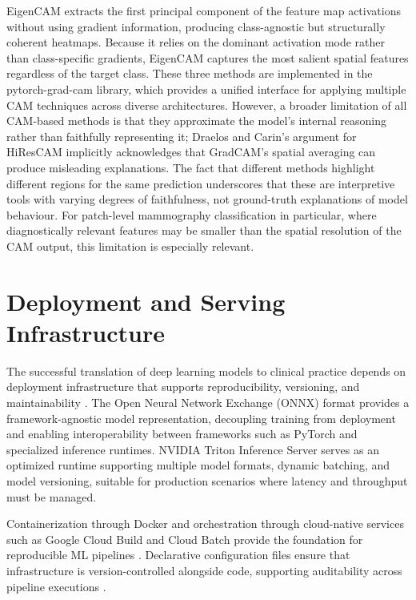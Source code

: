 \documentclass[justified,notoc,openany]{tufte-book}
\begin{document}
EigenCAM \cite{MuhammadYeasin2020} extracts the first principal component of the feature map activations without using gradient information, producing class-agnostic but structurally coherent heatmaps. Because it relies on the dominant activation mode rather than class-specific gradients, EigenCAM captures the most salient spatial features regardless of the target class. These three methods are implemented in the pytorch-grad-cam library, which provides a unified interface for applying multiple CAM techniques across diverse architectures. However, a broader limitation of all CAM-based methods is that they approximate the model's internal reasoning rather than faithfully representing it; Draelos and Carin's argument for HiResCAM implicitly acknowledges that GradCAM's spatial averaging can produce misleading explanations. The fact that different methods highlight different regions for the same prediction underscores that these are interpretive tools with varying degrees of faithfulness, not ground-truth explanations of model behaviour. For patch-level mammography classification in particular, where diagnostically relevant features may be smaller than the spatial resolution of the CAM output, this limitation is especially relevant.

\section{Deployment and Serving Infrastructure}\label{deployment-and-serving-infrastructure}

The successful translation of deep learning models to clinical practice depends on deployment infrastructure that supports reproducibility, versioning, and maintainability \cite{Grant2020}. The Open Neural Network Exchange (ONNX) format \cite{ONNX2019} provides a framework-agnostic model representation, decoupling training from deployment and enabling interoperability between frameworks such as PyTorch and specialized inference runtimes. NVIDIA Triton Inference Server \cite{NVIDIA2025} serves as an optimized runtime supporting multiple model formats, dynamic batching, and model versioning, suitable for production scenarios where latency and throughput must be managed.

Containerization through Docker and orchestration through cloud-native services such as Google Cloud Build and Cloud Batch provide the foundation for reproducible ML pipelines \cite{Grant2020}. Declarative configuration files ensure that infrastructure is version-controlled alongside code, supporting auditability across pipeline executions \cite{Bradbury2018}.
\end{document}
